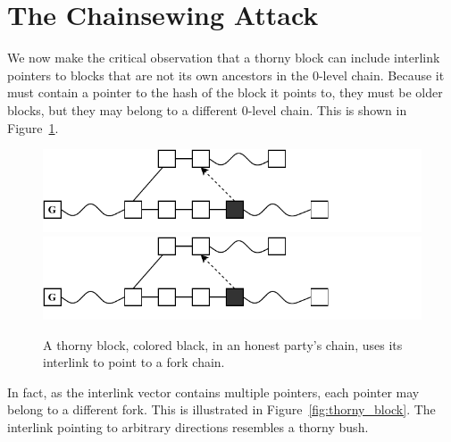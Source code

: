 \section{The Chainsewing Attack}\label{sec:attack}
We now make the critical observation that a thorny block can include interlink
pointers to blocks that are not its own ancestors in the $0$-level chain.
Because it must contain a pointer to the hash of the block it points to, they
must be older blocks, but they may belong to a
different $0$-level chain. This is shown in Figure~\ref{fig:false_interlink}.

\begin{figure}[h]
	\begin{center}
		\iftwocolumn
			\includegraphics[width=0.9\columnwidth]{figures/false_interlink.pdf}
		\else
			\includegraphics[width=0.8\columnwidth]{figures/false_interlink.pdf}
		\fi
	\end{center}
    \caption{A thorny block, colored black, in an honest party's chain, uses its interlink to point to a fork chain.}
	\label{fig:false_interlink}
\end{figure}

In fact, as the interlink vector contains multiple pointers, each pointer may
belong to a different fork. This is illustrated in
Figure~\ref{fig:thorny_block}. The interlink pointing to arbitrary directions
resembles a thorny bush.

